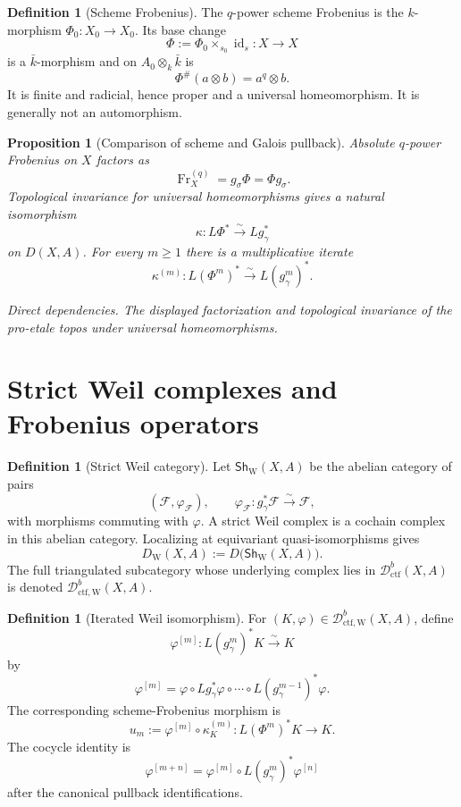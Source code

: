 \documentclass[10pt]{article}
\newtheorem{proposition}[theorem]{Proposition}
\theoremstyle{definition}
\newtheorem{definition}[theorem]{Definition}
\newcommand{\Dctf}{\mathcal D^b_{\mathrm{ctf}}}
\newcommand{\DctfW}{\mathcal D^b_{\mathrm{ctf},\mathrm W}}
\newcommand{\depends}[1]{\par\smallskip\noindent\textit{Direct dependencies.} #1\par}
\begin{document}
\begin{definition}[Scheme Frobenius]
The \(q\)-power scheme Frobenius is the \(k\)-morphism
\(\Phi_0:X_0\to X_0\).  Its base change
\[
 \Phi:=\Phi_0\times_{s_0}\operatorname{id}_s:X\to X
\]
is a \(\bar k\)-morphism and on \(A_0\otimes_k\bar k\) is
\[
 \Phi^\#(a\otimes b)=a^q\otimes b.
\]
It is finite and radicial, hence proper and a universal homeomorphism.  It
is generally not an automorphism.
\end{definition}

\begin{proposition}[Comparison of scheme and Galois pullback]
Absolute \(q\)-power Frobenius on \(X\) factors as
\[
 \operatorname{Fr}^{(q)}_X=g_\sigma\Phi=\Phi g_\sigma.
\]
Topological invariance for universal homeomorphisms gives a natural
isomorphism
\[
 \kappa:L\Phi^*\xrightarrow{\sim}Lg_\gamma^*
\]
on \(D(X,A)\).  For every \(m\geq1\) there is a multiplicative iterate
\[
 \kappa^{(m)}:L(\Phi^m)^*\xrightarrow{\sim}L(g_\gamma^m)^*.
\]
\depends{The displayed factorization and topological invariance of the
pro-etale topos under universal homeomorphisms.}
\end{proposition}

\section{Strict Weil complexes and Frobenius operators}

\begin{definition}[Strict Weil category]
Let \(\mathsf{Sh}_{\mathrm W}(X,A)\) be the abelian category of pairs
\[
 (\mathcal F,\varphi_{\mathcal F}),\qquad
 \varphi_{\mathcal F}:g_\gamma^*\mathcal F\xrightarrow{\sim}\mathcal F,
\]
with morphisms commuting with \(\varphi\).  A strict Weil complex is a
cochain complex in this abelian category.  Localizing at equivariant
quasi-isomorphisms gives
\[
 D_{\mathrm W}(X,A):=
 D\bigl(\mathsf{Sh}_{\mathrm W}(X,A)\bigr).
\]
The full triangulated subcategory whose underlying complex lies in
\(\Dctf(X,A)\) is denoted \(\DctfW(X,A)\).
\end{definition}

\begin{definition}[Iterated Weil isomorphism]
For \((K,\varphi)\in\DctfW(X,A)\), define
\[
 \varphi^{[m]}:L(g_\gamma^m)^*K\xrightarrow{\sim}K
\]
by
\[
 \varphi^{[m]}=
 \varphi\circ Lg_\gamma^*\varphi\circ\cdots\circ
 L(g_\gamma^{m-1})^*\varphi.
\]
The corresponding scheme-Frobenius morphism is
\[
 u_m:=\varphi^{[m]}\circ\kappa_K^{(m)}:
 L(\Phi^m)^*K\longrightarrow K.
\]
The cocycle identity is
\[
 \varphi^{[m+n]}
 =\varphi^{[m]}\circ L(g_\gamma^m)^*\varphi^{[n]}
\]
after the canonical pullback identifications.
\end{definition}
\end{document}
